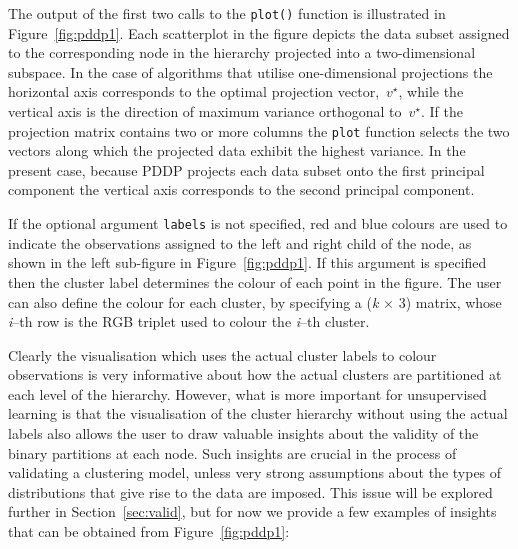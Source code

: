 \documentclass{book}
\begin{document}
\noindent
%
The output of the first two calls to the {\tt plot()} function is illustrated in
Figure~\ref{fig:pddp1}.
%
Each scatterplot in the figure depicts the data subset assigned to
the corresponding node in the hierarchy projected into a two-dimensional
subspace. In the case of algorithms that utilise one-dimensional projections
the horizontal axis corresponds to the optimal projection vector,~$v^\star$,
while the vertical axis is the direction of maximum variance orthogonal to~$v^\star$.
%
If the projection matrix contains two or more columns the {\tt plot} function
selects the two vectors along which the projected data exhibit the highest variance.
%
In the present case, because PDDP projects each data subset onto the first
principal component the vertical axis corresponds to the second principal component.

If the optional argument {\tt labels} is not specified, red and blue colours are used to
indicate the observations assigned to the left and right child of the node,
as shown in the left sub-figure in Figure~\ref{fig:pddp1}.
%
If this argument is specified then the cluster label determines
the colour of each point in the figure.
%
The user can also define the colour for each cluster, by specifying
a ({\it k} $\times$ 3) matrix, whose {\it i}--th row is the RGB triplet used to colour
the {\it i}--th cluster.


Clearly the visualisation which uses the actual cluster labels to colour
observations is very informative about how the actual clusters are partitioned
at each level of the hierarchy.
%
However, what is more important for unsupervised learning is that the
visualisation of the cluster hierarchy without using the actual labels also
allows the user to draw valuable insights about the validity of the binary
partitions at each node. Such insights are crucial in the process of validating
a clustering model, unless very strong assumptions about the types of
distributions that give rise to the data are imposed. This issue will be
explored further in Section~\ref{sec:valid}, but for now we provide a few
examples of insights that can be obtained from Figure~\ref{fig:pddp1}: 
\end{document}
